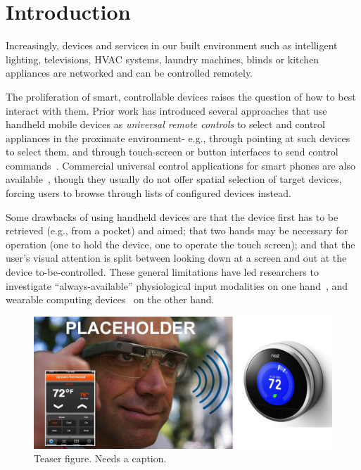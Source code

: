 \section{Introduction}
Increasingly, devices and services in our built environment such as intelligent lighting, televisions, HVAC systems, laundry machines, blinds or kitchen appliances are networked and can be controlled remotely.

The proliferation of smart, controllable devices raises the question of how to best interact with them. Prior work has introduced several approaches that use handheld mobile devices as {\em universal remote controls} to select and control appliances in the proximate environment- e.g., through pointing at such devices to select them, and through touch-screen or button interfaces to send control commands~\cite{}. Commercial universal control applications for smart phones are also available~\cite{}, though they usually do not offer spatial selection of target devices, forcing users to browse through lists of configured devices instead.

Some drawbacks of using handheld devices are that the device first has to be retrieved (e.g., from a pocket) and aimed; that two hands may be necessary for operation (one to hold the device, one to operate the touch screen); and that the user's visual attention is split between looking down at a screen and out at the device to-be-controlled.  These general limitations have led researchers to investigate ``always-available'' physiological input modalities on one hand~\cite{saponas}, and wearable computing devices~\cite{} on the other hand.

\begin{figure}[t]
\centering
\includegraphics[width=1.0\columnwidth]{figures/teaser}
\caption{Teaser figure. Needs a caption.}
\label{fig:teaser}
\end{figure}


